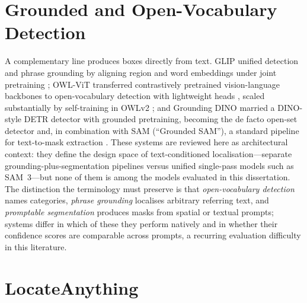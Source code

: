 \section{Grounded and Open-Vocabulary Detection}
\label{sec:lr-grounding}

A complementary line produces boxes directly from text. GLIP unified detection and phrase grounding by aligning region and word embeddings under joint pretraining \citep{li2022grounded}; OWL-ViT transferred contrastively pretrained vision-language backbones to open-vocabulary detection with lightweight heads \citep{minderer2022simple}, scaled substantially by self-training in OWLv2 \citep{minderer2023scaling}; and Grounding DINO married a DINO-style DETR detector with grounded pretraining, becoming the de facto open-set detector and, in combination with SAM (``Grounded SAM''), a standard pipeline for text-to-mask extraction \citep{liu2024grounding,ren2024grounded}. These systems are reviewed here as architectural context: they define the design space of text-conditioned localisation---separate grounding-plus-segmentation pipelines versus unified single-pass models such as SAM~3---but none of them is among the models evaluated in this dissertation. The distinction the terminology must preserve is that \emph{open-vocabulary detection} names categories, \emph{phrase grounding} localises arbitrary referring text, and \emph{promptable segmentation} produces masks from spatial or textual prompts; systems differ in which of these they perform natively and in whether their confidence scores are comparable across prompts, a recurring evaluation difficulty in this literature.

\section{LocateAnything}
\label{sec:lr-locateanything}

